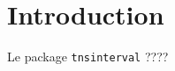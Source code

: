 \documentclass[12pt,a4paper]{article}
\begin{document}
\section{Introduction}

Le package \verb#tnsinterval# ????
\end{document}
